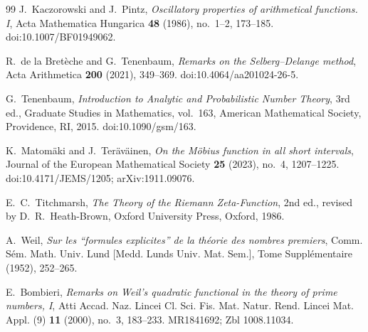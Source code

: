 \documentclass[11pt]{amsart}
\numberwithin{equation}{section}
\theoremstyle{plain}
\theoremstyle{definition}
\theoremstyle{remark}
\begin{document}
\begin{thebibliography}{99}
J.~Kaczorowski and J.~Pintz,
\emph{Oscillatory properties of arithmetical functions. I},
Acta Mathematica Hungarica \textbf{48} (1986), no.~1--2, 173--185.
doi:10.1007/BF01949062.

R.~de la Bret\`eche and G.~Tenenbaum,
\emph{Remarks on the Selberg--Delange method},
Acta Arithmetica \textbf{200} (2021), 349--369.
doi:10.4064/aa201024-26-5.

G.~Tenenbaum,
\emph{Introduction to Analytic and Probabilistic Number Theory},
3rd ed., Graduate Studies in Mathematics, vol.~163,
American Mathematical Society, Providence, RI, 2015.
doi:10.1090/gsm/163.

K.~Matom\"aki and J.~Ter\"av\"ainen,
\emph{On the M\"obius function in all short intervals},
Journal of the European Mathematical Society \textbf{25} (2023), no.~4,
1207--1225.
doi:10.4171/JEMS/1205; arXiv:1911.09076.

E.~C.~Titchmarsh,
\emph{The Theory of the Riemann Zeta-Function},
2nd ed., revised by D.~R.~Heath-Brown,
Oxford University Press, Oxford, 1986.


A.~Weil,
\emph{Sur les ``formules explicites'' de la th\'eorie des nombres premiers},
Comm. S\'em. Math. Univ. Lund [Medd. Lunds Univ. Mat. Sem.],
Tome Suppl\'ementaire (1952), 252--265.

E.~Bombieri,
\emph{Remarks on Weil's quadratic functional in the theory of prime numbers, I},
Atti Accad. Naz. Lincei Cl. Sci. Fis. Mat. Natur. Rend. Lincei Mat. Appl.
(9) \textbf{11} (2000), no.~3, 183--233.
MR1841692; Zbl 1008.11034.

\end{thebibliography}
\end{document}
